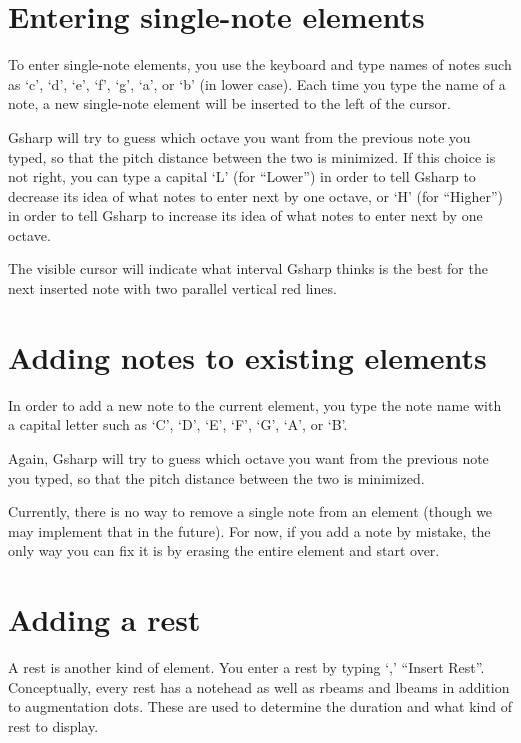 \documentclass[11pt]{book}
\def\gs{Gsharp}
\def\kbd#1{`#1'}
\def\command#1{``#1''}
\begin{document}
\section{Entering single-note elements}

To enter single-note elements, you use the keyboard and type names of
notes such as \kbd{c}, \kbd{d}, \kbd{e}, \kbd{f}, \kbd{g}, \kbd{a}, or
\kbd{b} (in lower case).  Each time you type the name of a note, a new
single-note element will be inserted to the left of the cursor.

{\gs} will try to guess which octave you want from the previous note
you typed, so that the pitch distance between the two is minimized.
If this choice is not right, you can type a capital \kbd{L} (for
\command{Lower}) in order to tell {\gs} to decrease its idea of what
notes to enter next by one octave, or \kbd{H} (for \command{Higher})
in order to tell {\gs} to increase its idea of what notes to enter
next by one octave.

The visible cursor will indicate what interval {\gs} thinks is the
best for the next inserted note with two parallel vertical red lines. 

\section{Adding notes to existing elements}

In order to add a new note to the current element, you type the note
name with a capital letter such as \kbd{C}, \kbd{D}, \kbd{E}, \kbd{F},
\kbd{G}, \kbd{A}, or \kbd{B}.

Again, {\gs} will try to guess which octave you want from the previous
note you typed, so that the pitch distance between the two is
minimized.

Currently, there is no way to remove a single note from an element
(though we may implement that in the future).  For now, if you add a
note by mistake, the only way you can fix it is by erasing the entire
element and start over. 

\section{Adding a rest}

A rest is another kind of element.  You enter a rest by typing \kbd{,}
\command{Insert Rest}.  Conceptually, every rest has a notehead as
well as rbeams and lbeams in addition to augmentation dots.  These are
used to determine the duration and what kind of rest to display.
\end{document}
